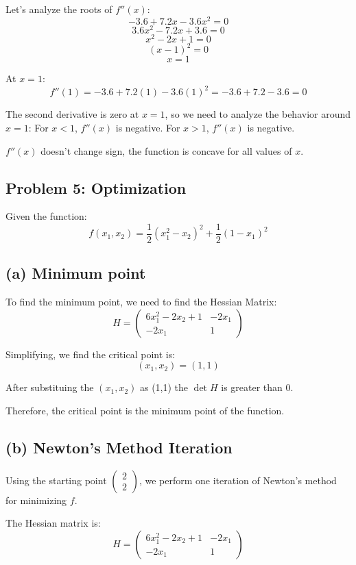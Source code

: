 \documentclass[12pt]{article}
\begin{document}
Let's analyze the roots of \(f''(x)\):
\[
-3.6 + 7.2x - 3.6x^2 = 0
\]
\[
3.6x^2 - 7.2x + 3.6 = 0
\]
\[
x^2 - 2x + 1 = 0
\]
\[
(x - 1)^2 = 0
\]
\[
x = 1
\]

At \(x = 1\):
\[
f''(1) = -3.6 + 7.2(1) - 3.6(1)^2 = -3.6 + 7.2 - 3.6 = 0
\]

The second derivative is zero at \(x = 1\), so we need to analyze the behavior around \(x = 1\):
For \(x < 1\), \(f''(x)\) is negative.
For \(x > 1\), \(f''(x)\) is negative.

 \(f''(x)\) doesn't change sign, the function is concave for all values of \(x\).

\subsection*{Problem 5: Optimization}

Given the function:
\[
f(x_1, x_2) = \frac{1}{2}(x_1^2 - x_2)^2 + \frac{1}{2}(1 - x_1)^2
\]

\subsection*{(a) Minimum point}

To find the minimum point, we need to find the Hessian Matrix:
\[
H = \begin{pmatrix}
6x_1^2 - 2x_2 + 1 & -2x_1 \\
-2x_1 & 1
\end{pmatrix}
\]

Simplifying, we find the critical point is:
\[
(x_1, x_2) = (1, 1)
\]

After substituing the \((x_1, x_2)\) as (1,1) the \(\det{H}\) is greater than 0.

Therefore, the critical point is the minimum point of the function.

\subsection*{(b) Newton's Method Iteration}

Using the starting point \(\begin{pmatrix} 2 \\ 2 \end{pmatrix}\), we perform one iteration of Newton's method for minimizing \(f\).

The Hessian matrix is:
\[
H = \begin{pmatrix}
6x_1^2 - 2x_2 + 1 & -2x_1 \\
-2x_1 & 1
\end{pmatrix}
\]
\end{document}
